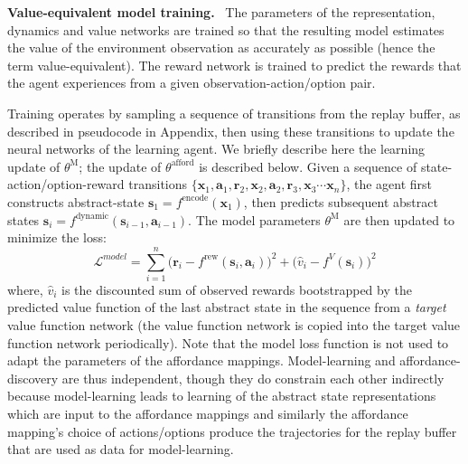 \documentclass[nohyperref]{article}
\theoremstyle{plain}
\theoremstyle{definition}
\theoremstyle{remark}
\renewcommand{\paragraph}[1]{\textbf{#1}\ }
\newcommand{\obs}{\mathbf{x}}
\newcommand{\state}{\mathbf{s}}
\newcommand{\action}{\mathbf{a}}
\newcommand{\afford}{\mathrm{afford}}
\newcommand{\thetaafford}{\theta^{\afford}}
\newcommand{\encode}{\mathrm{encode}}
\newcommand{\fencode}{f^{\encode}}
\newcommand{\dynamic}{\mathrm{dynamic}}
\newcommand{\fdynamic}{f^{\dynamic}}
\newcommand{\rew}{\mathbf{r}}
\newcommand{\reward}{\mathrm{rew}}
\newcommand{\freward}{f^{\reward}}
\newcommand{\val}{V}
\newcommand{\fvalue}{f^{\val}}
\newcommand{\thetamodel}{\theta^{\mathrm{M}}}
\begin{document}
\paragraph{Value-equivalent model training.}
The parameters of the representation, dynamics and value networks are trained so that the resulting model  estimates the value of the environment observation as accurately as possible (hence the term value-equivalent). The reward network is trained to predict the  rewards that the agent experiences from a given observation-action/option pair.

Training operates by sampling a sequence of transitions from the replay buffer, as described in pseudocode in Appendix, then using these transitions to update the neural networks of the learning agent. We briefly describe here the learning update of $\thetamodel$; the update of  $\thetaafford$ is described below.  Given a sequence of state-action/option-reward transitions $\{ \obs_1, \action_1, \rew_2, \obs_2, \action_2, \rew_3, \obs_3 \cdots \obs_n \}$, 
the agent first constructs abstract-state $\state_1 = \fencode(\obs_1)$, then predicts subsequent abstract states $\state_i = \fdynamic(\state_{i-1},\action_{i-1})$.
The model parameters $\thetamodel$ are then updated to minimize the loss:
\begin{equation*}
    \mathcal{L}^{model} = \sum_{i=1}^{n} \Big( \rew_i - \freward(\state_i, \action_i) \Big)^2 + \Big( \hat{v}_i - \fvalue(\state_i) \Big)^2    
\end{equation*}
where, $\hat{v}_i$ is the discounted sum of observed rewards bootstrapped by the predicted value function of the last abstract state in the sequence from a \emph{target} value function network (the value function network is copied into the target value function network periodically). Note that the model loss function is not used to adapt the parameters of the affordance mappings. Model-learning and affordance-discovery are thus independent, though they do constrain each other indirectly because model-learning leads to learning of the abstract state representations which are input to the affordance mappings and similarly the affordance mapping's choice of actions/options produce the trajectories for the replay buffer that are used as data for model-learning. 
\end{document}

